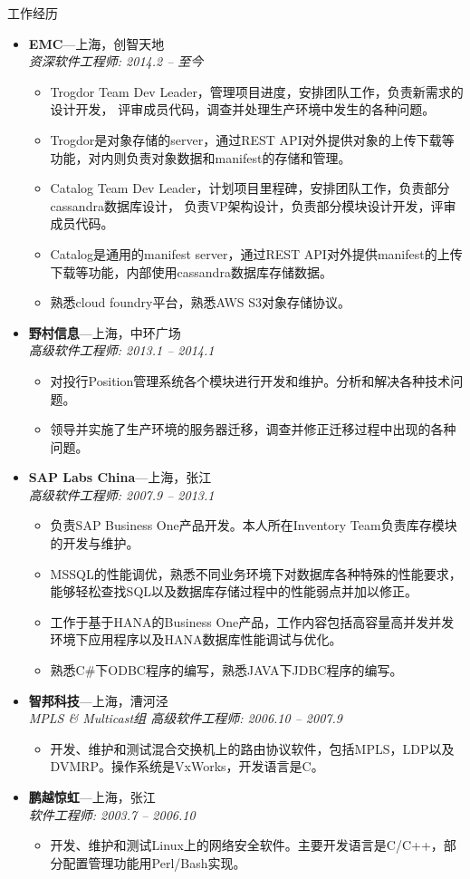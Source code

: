 \documentclass[11pt,oneside]{article}
\newenvironment{ressection}[1]{
	\vspace{4pt}
	{\selectfont\Large#1}
	\begin{itemize}
	\vspace{3pt}
}{
	\end{itemize}
}
\newcommand{\ressubitem}[1]{
	\vspace{-1pt}
	\item \begin{flushleft} #1 \end{flushleft}
}
\newcommand{\resbigitem}[3]{
	\vspace{-5pt}
	\item
	\textbf{#1}---#2 \\
	\textit{#3}
}
\newenvironment{ressubsec}[3]{
	\resbigitem{#1}{#2}{#3}
	\vspace{-2pt}
	\begin{itemize}
}{
    \end{itemize}
}
\begin{document}
\begin{ressection}{工作经历}

	\begin{ressubsec}{EMC}{上海，创智天地}{资深软件工程师: 2014.2 -- 至今}
		\ressubitem{Trogdor Team Dev Leader，管理项目进度，安排团队工作，负责新需求的设计开发，
					评审成员代码，调查并处理生产环境中发生的各种问题。}
		\ressubitem{Trogdor是对象存储的server，通过REST API对外提供对象的上传下载等功能，对内则负责对象数据和manifest的存储和管理。}
		\ressubitem{Catalog Team Dev Leader，计划项目里程碑，安排团队工作，负责部分cassandra数据库设计，
					负责VP架构设计，负责部分模块设计开发，评审成员代码。}
		\ressubitem{Catalog是通用的manifest server，通过REST API对外提供manifest的上传下载等功能，内部使用cassandra数据库存储数据。}
		\ressubitem{熟悉cloud foundry平台，熟悉AWS S3对象存储协议。}
	\end{ressubsec}

	\begin{ressubsec}{野村信息}{上海，中环广场}{高级软件工程师: 2013.1 -- 2014.1}
		\ressubitem{对投行Position管理系统各个模块进行开发和维护。分析和解决各种技术问题。}
		\ressubitem{领导并实施了生产环境的服务器迁移，调查并修正迁移过程中出现的各种问题。}
	\end{ressubsec}

	\begin{ressubsec}{SAP Labs China}{上海，张江}{高级软件工程师: 2007.9 -- 2013.1}
		\ressubitem{负责SAP Business One产品开发。本人所在Inventory Team负责库存模块的开发与维护。}
		\ressubitem{MSSQL的性能调优，熟悉不同业务环境下对数据库各种特殊的性能要求，
					能够轻松查找SQL以及数据库存储过程中的性能弱点并加以修正。}
		\ressubitem{工作于基于HANA的Business One产品，工作内容包括高容量高并发并发环境下应用程序以及HANA数据库性能调试与优化。}
		\ressubitem{熟悉C\#下ODBC程序的编写，熟悉JAVA下JDBC程序的编写。}
	\end{ressubsec}

	\begin{ressubsec}{智邦科技}{上海，漕河泾}{MPLS \& Multicast组 高级软件工程师: 2006.10 -- 2007.9}
		\ressubitem{开发、维护和测试混合交换机上的路由协议软件，包括MPLS，LDP以及DVMRP。操作系统是VxWorks，开发语言是C。}
	\end{ressubsec}

	\begin{ressubsec}{鹏越惊虹}{上海，张江}{软件工程师: 2003.7 -- 2006.10}
		\ressubitem{开发、维护和测试Linux上的网络安全软件。主要开发语言是C/C++，部分配置管理功能用Perl/Bash实现。}
	\end{ressubsec}

\end{ressection}
\end{document}
